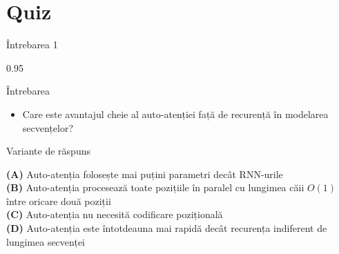 \documentclass[9pt, aspectratio=169, t]{beamer}
\begin{document}
\section{Quiz}

\begin{frame}{Întrebarea 1}
    \begin{cminipage}{0.95\textwidth}
    \begin{alertblock}{Întrebarea}
        \begin{itemize}\setlength{\itemsep}{0pt}
            \item Care este avantajul cheie al auto-atenției față de recurență în modelarea secvențelor?
        \end{itemize}
    \end{alertblock}

    \vspace{0.3cm}

    \begin{block}{Variante de răspuns}

        \textcolor{MainBlue}{\textbf{(A)}} Auto-atenția folosește mai puțini parametri decât RNN-urile\\[3pt]

        \textcolor{MainBlue}{\textbf{(B)}} Auto-atenția procesează toate pozițiile în paralel cu lungimea căii $O(1)$ între oricare două poziții\\[3pt]

        \textcolor{MainBlue}{\textbf{(C)}} Auto-atenția nu necesită codificare pozițională\\[3pt]

        \textcolor{MainBlue}{\textbf{(D)}} Auto-atenția este întotdeauna mai rapidă decât recurența indiferent de lungimea secvenței

    \end{block}
    \end{cminipage}
\end{frame}
\end{document}
